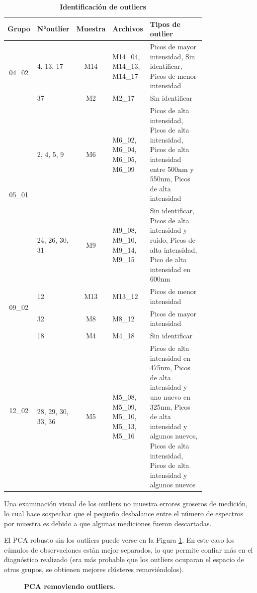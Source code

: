 \documentclass[12pt]{article}
\begin{document}
\begin{table}[htbp]
\centering
\begin{tabular}{|c|p{0.1\linewidth}|c|p{0.19\linewidth}|p{0.5\linewidth}|}
\hline
Grupo & N°outlier & Muestra & Archivos & Tipos de outlier \\ \hline
\multirow{2}{3em}{04\_02} & 4, 13, 17 & M14 & M14\_04, M14\_13, M14\_17 & Picos de mayor intensidad, Sin identificar, Picos de menor intensidad \\ \cline{2-5}
& 37 & M2 & M2\_17 & Sin identificar \\ \hline
\multirow{2}{3em}{05\_01} & 2, 4, 5, 9 & M6 & M6\_02, M6\_04, M6\_05, M6\_09 & Picos de alta intensidad, Picos de alta intensidad, Picos de alta intensidad entre 500nm y 550nm, Picos de alta intensidad \\ \cline{2-5}
& 24, 26, 30, 31 & M9 & M9\_08, M9\_10, M9\_14, M9\_15  & Sin identificar, Picos de alta intensidad y ruido, Picos de alta intensidad, Pico de alta intensidad en 600nm \\ \hline
\multirow{2}{3em}{09\_02} & 12 & M13 & M13\_12 & Picos de menor intensidad \\ \cline{2-5}
& 32 & M8 & M8\_12 & Picos de mayor intensidad \\ \hline
\multirow{2}{3em}{12\_02} & 18 & M4 & M4\_18 & Sin identificar \\ \cline{2-5}
& 28, 29, 30, 33, 36 & M5 & M5\_08, M5\_09, M5\_10, M5\_13, M5\_16 & Picos de alta intensidad en 475nm, Picos de alta intensidad y uno nuevo en 325nm, Picos de alta intensidad y algunos nuevos, Picos de alta intensidad, Picos de alta intensidad y algunos nuevos  \\ \hline
\end{tabular}
\caption{\textbf{Identificación de outliers}}
\label{table:outliers}
\end{table}

Una examinación visual de los outliers no muestra errores groseros de medición, lo cual hace sospechar que el pequeño desbalance entre el número de espectros por muestra es debido a que algunas mediciones fueron descartadas.

El PCA robusto sin los outliers puede verse en la Figura \ref{fig:pca2}. En este caso los cúmulos de observaciones están mejor separados, lo que permite confiar más en el diagnóstico realizado (era más probable que los outliers ocuparan el espacio de otros grupos, se obtienen mejores clústeres removiéndolos).

\begin{figure}[htbp]
    \centering
    
    \caption{\textbf{PCA removiendo outliers.}}
    \label{fig:pca2}
\end{figure}
\end{document}
